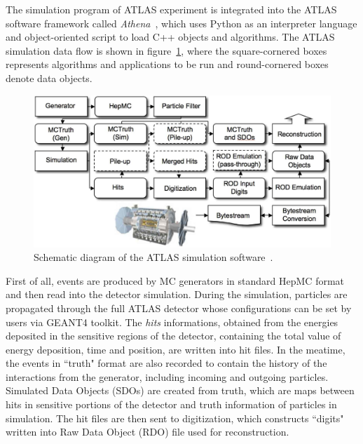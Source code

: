 
The simulation program of ATLAS experiment is integrated into the ATLAS software framework called \textit{Athena}~\cite{atlas:athena},
which uses Python as an interpreter language and object-oriented script to load C++ objects and algorithms.
The ATLAS simulation data flow is shown in figure~\ref{fig:frame_overview},
where the square-cornered boxes represents algorithms and applications to be run and round-cornered boxes denote data objects.
\begin{figure}[!htb]
  \centering
  \includegraphics[width=1.0\textwidth]{figures/Simulation/outline_atalsSimulation_v2.png}
  \caption{Schematic diagram of the ATLAS simulation software~\cite{Aad:2010ah}.}
  \label{fig:frame_overview}
\end{figure}

First of all, events are produced by MC generators in standard HepMC format and then read into the detector simulation.
During the simulation, particles are propagated through the full ATLAS detector whose configurations can be set by users via GEANT4 toolkit.
The \textit{hits} informations, obtained from the energies deposited in the sensitive regions of the detector, containing the total value of energy deposition, time and position, are written into hit files.
In the meatime, the events in ``truth" format are also recorded to contain the history of the interactions from the generator, including incoming and outgoing particles.
Simulated Data Objects (SDOs) are created from truth, which are maps between hits in sensitive portions of the detector and truth information of particles in simulation.
The hit files are then sent to digitization, which constructs ``digits" written into Raw Data Object (RDO) file used for reconstruction.

